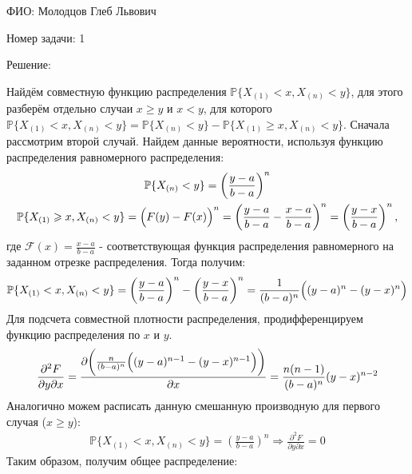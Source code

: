 \documentclass[14pt]{extarticle}
\begin{document}
ФИО: Молодцов Глеб Львович

\vspace{10pt}

Номер задачи: 1

\vspace{10pt}

Решение:

\vspace{10pt}

Найдём совместную функцию распределения $\mathbb{P}\{X_{(1)}<x,X_{(n)}<y\}$, для этого разберём отдельно случаи $x\geqslant y$  и  $x<y$, для которого $\mathbb{P}\{X_{(1)}<x,X_{(n)}<y\}=\mathbb{P}\{X_{(n)}<y\}-\mathbb{P}\{X_{(1)}\geqslant x,X_{(n)}<y\}$. Сначала рассмотрим второй случай. Найдем данные вероятности, используя функцию распределения равномерного распределения:
\begin{gather*} 
    \mathbb{P}\{X_{(n)}<y\} = \left(\frac{y-a}{b-a}\right)^n  \\
    \mathbb{P}\{X_{(1)}\geqslant x,X_{(n)}<y\} = \Bigl(F(y) - F(x)\Bigr)^n = \left(\frac{y-a}{b-a} - \frac{x-a}{b-a}\right)^n = \left(\frac{y-x}{b-a}\right)^n ,
\end{gather*}
где $\mathcal{F}(x) = \frac{x-a}{b-a}$ - соответствующая функция распределения равномерного на заданном отрезке распределения. Тогда получим: 
\begin{equation*} 
\mathbb{P}\{X_{(1)}<x,X_{(n)}<y\}= \left(\frac{y-a}{b-a}\right)^n - \left(\frac{y-x}{b-a}\right)^n = \frac{1}{(b-a)^n}\Bigl( (y-a)^n - (y-x)^n \Bigr)
\end{equation*}
Для подсчета совместной плотности распределения, продифференцируем функцию распределения по $x$ и $y$. 
\begin{equation*} 
\frac{\partial^2 F}{\partial y \partial x}= \frac{\partial \biggl(\frac{n}{(b-a)^n}\Bigl( (y-a)^{n-1} - (y-x)^{n-1} \Bigr) \biggr)}{\partial x} = \frac{n(n-1)}{(b-a)^n}(y-x)^{n-2}
\end{equation*}
Аналогично можем расписать данную смешанную производную для первого случая ($x \geqslant y$):
\begin{gather*} 
\mathbb{P}\{X_{(1)}<x,X_{(n)}<y\} = \left(\frac{y-a}{b-a}\right)^n \Rightarrow \frac{\partial^2 F}{\partial y \partial x}=0
\end{gather*} 
Таким образом, получим общее распределение:
\end{document}
